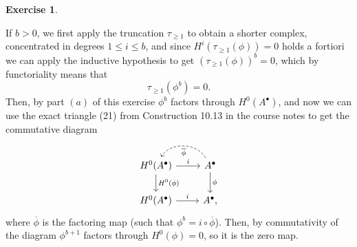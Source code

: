 \documentclass[a4paper]{article}
\theoremstyle{definition}
\theoremstyle{definition}
\theoremstyle{remark}
\theoremstyle{definition}
\newtheorem{exercise}{Exercise}[section]
\begin{document}
\begin{exercise}
\begin{itemize}
			If $b>0$, we first apply the truncation $\tau_{\geq 1}$ to obtain a shorter complex, concentrated in degrees $1\leq i \leq b$, and since $H^i(\tau_{\geq
			1}(\phi))=0$ holds a fortiori
			we can apply the inductive hypothesis to get
			$\left( \tau_{\geq 1}(\phi) \right)^b=0$, which by functoriality means that
			$$\tau_{\geq 1}(\phi^b)=0.$$
Then, by part $(a)$ of this exercise $\phi^b$ factors through $H^0(A^\bullet)$, and now we can use the exact triangle (21) from Construction 10.13 in the course notes to get the
commutative diagram
\begin{equation*}
	\begin{tikzcd}
		H^0(A^\bullet)\ar[d, "H^0(\phi)"]\rar["i"]&A^\bullet\ar[l, "\overline{\phi}", dashed, bend right=60]\ar[d,"\phi"]\\
		H^0(A^\bullet)\rar["i"]&A^\bullet,
	\end{tikzcd}
\end{equation*}
where $\overline{\phi}$ is the factoring map (such that $\phi^b=i\circ\overline{\phi}$). Then, by commutativity of the diagram $\phi^{b+1}$ factors through $H^0(\phi)=0$, so it is
the zero map.
	\end{itemize}
\end{exercise}
\end{document}
